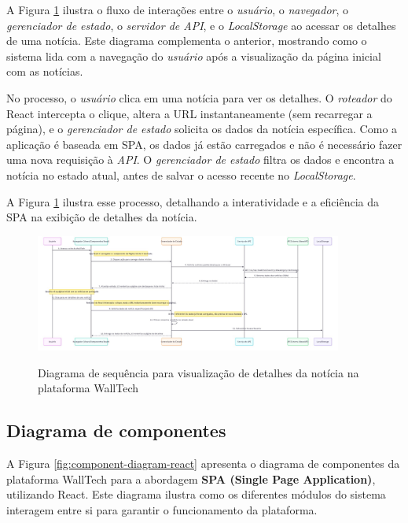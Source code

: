 A Figura \ref{fig:sequence-diagram-details} ilustra o fluxo de interações entre o \textit{usuário}, o \textit{navegador}, o \textit{gerenciador de estado}, o \textit{servidor de API}, e o \textit{LocalStorage} ao acessar os detalhes de uma notícia. Este diagrama complementa o anterior, mostrando como o sistema lida com a navegação do \textit{usuário} após a visualização da página inicial com as notícias.

No processo, o \textit{usuário} clica em uma notícia para ver os detalhes. O \textit{roteador} do React intercepta o clique, altera a URL instantaneamente (sem recarregar a página), e o \textit{gerenciador de estado} solicita os dados da notícia específica. Como a aplicação é baseada em SPA, os dados já estão carregados e não é necessário fazer uma nova requisição à \textit{API}. O \textit{gerenciador de estado} filtra os dados e encontra a notícia no estado atual, antes de salvar o acesso recente no \textit{LocalStorage}.

A Figura \ref{fig:sequence-diagram-details} ilustra esse processo, detalhando a interatividade e a eficiência da SPA na exibição de detalhes da notícia.

\begin{figure}[H]
  \centering
  \caption{Diagrama de sequência para visualização de detalhes da notícia na plataforma WallTech}
  \includegraphics[width=0.9\textwidth]{media/wall_tech_detail_sequence_diagram.jpeg}
  \label{fig:sequence-diagram-details}
\end{figure}


\subsection{Diagrama de componentes}
A Figura \ref{fig:component-diagram-react} apresenta o diagrama de componentes da plataforma WallTech para a abordagem \textbf{SPA (Single Page Application)}, utilizando React. Este diagrama ilustra como os diferentes módulos do sistema interagem entre si para garantir o funcionamento da plataforma.

